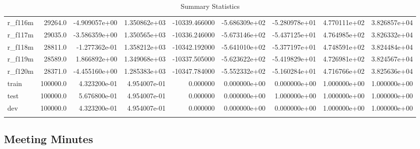 \documentclass[10pt]{article}
\begin{document}
\begin{landscape}
\begin{longtable}{lrrrrrrrr}
r\_f116m                 &   29264.0 & -4.909057e+00 &  1.350862e+03 & -10339.466000 & -5.686309e+02 & -5.280978e+01 &  4.770111e+02 &  3.826857e+04 \\
r\_f117m                 &   29035.0 & -3.586359e+00 &  1.350565e+03 & -10336.246000 & -5.673146e+02 & -5.437125e+01 &  4.764985e+02 &  3.826332e+04 \\
r\_f118m                 &   28811.0 & -1.277362e-01 &  1.358212e+03 & -10342.192000 & -5.641010e+02 & -5.377197e+01 &  4.748591e+02 &  3.824484e+04 \\
r\_f119m                 &   28589.0 &  1.866892e+00 &  1.349068e+03 & -10337.505000 & -5.623622e+02 & -5.419829e+01 &  4.726981e+02 &  3.824567e+04 \\
r\_f120m                 &   28371.0 & -4.455160e+00 &  1.285383e+03 & -10347.784000 & -5.552332e+02 & -5.160284e+01 &  4.716766e+02 &  3.825636e+04 \\
train                   &  100000.0 &  4.323200e-01 &  4.954007e-01 &      0.000000 &  0.000000e+00 &  0.000000e+00 &  1.000000e+00 &  1.000000e+00 \\
test                    &  100000.0 &  5.676800e-01 &  4.954007e-01 &      0.000000 &  0.000000e+00 &  1.000000e+00 &  1.000000e+00 &  1.000000e+00 \\
dev                     &  100000.0 &  4.323200e-01 &  4.954007e-01 &      0.000000 &  0.000000e+00 &  0.000000e+00 &  1.000000e+00 &  1.000000e+00 \\
\bottomrule
\caption{Summary Statistics}
\label{table:ss}
\end{longtable}
\end{landscape}
\subsection{Meeting Minutes}
\end{document}
